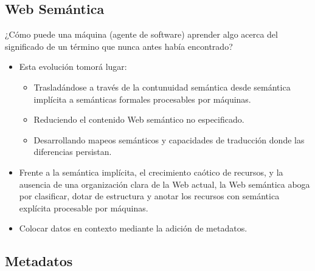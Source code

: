 \documentclass[a4paper,12pt,twoside,final,spanish]{article}
\begin{document}
\subsection{Web Semántica}

¿Cómo puede una máquina (agente de software) aprender algo acerca del significado de un término que nunca antes había encontrado?

\begin{itemize}

\item Esta evolución tomorá lugar:
	\begin{itemize}
	\item Trasladándose a través de la contunuidad semántica desde semántica implícita 	a  semánticas formales procesables por máquinas.
	\item Reduciendo el contenido Web semántico no especificado.
	\item Desarrollando mapeos semánticos y capacidades de traducción donde las 			diferencias persistan.
	\end{itemize}

\item Frente a la semántica implícita, el crecimiento caótico de recursos, y la ausencia de una organización clara de la Web actual, la Web semántica aboga por clasificar, dotar de estructura y anotar los recursos con semántica explícita procesable por máquinas.

\item Colocar datos en contexto mediante la adición de metadatos.
\end{itemize}

\subsection{Metadatos}
\end{document}
